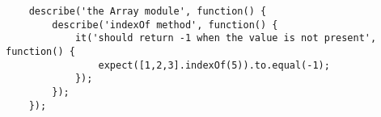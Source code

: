 
\begin{lstlisting}
	describe('the Array module', function() {
		describe('indexOf method', function() {
			it('should return -1 when the value is not present', function() {
				expect([1,2,3].indexOf(5)).to.equal(-1);
			});
		});
	});
\end{lstlisting}
